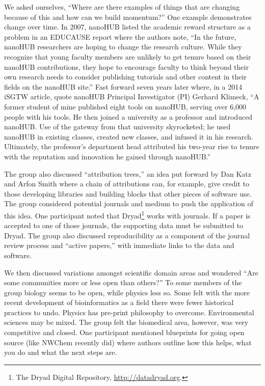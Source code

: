 \documentclass[11pt, oneside]{amsart}
\begin{document}
We asked ourselves, ``Where are there examples of things that are changing
because of this and how can we build momentum?'' One example demonstrates change
over time. In 2007, nanoHUB listed the academic reward structure as a problem in
an EDUCAUSE report where the authors note, ``In the future, nanoHUB researchers
are hoping to change the research culture. While they recognize that young
faculty members are unlikely to get tenure based on their nanoHUB contributions,
they hope to encourage faculty to think beyond their own research needs to
consider publishing tutorials and other content in their fields on the
nanoHUB site.'' Fast forward seven years later where, in a 2014 iSGTW article,
quote nanoHUB Principal Investigator (PI) Gerhard Klimeck, ``A former student of
mine published eight tools on nanoHUB, serving over 6,000 people with his tools.
He then joined a university as a professor and introduced nanoHUB. Use of the
gateway from that university skyrocketed; he used nanoHUB in existing classes,
created new classes, and infused it in his research. Ultimately, the professor's
department head attributed his two-year rise to tenure with the reputation and
innovation he gained through nanoHUB.''

The group also discussed ``attribution trees,'' an idea put forward by Dan Katz
and Arfon Smith where a chain of attributions can, for example, give credit to
those developing libraries and building blocks that other pieces of software
use. The group considered potential journals and medium to push the application
of this idea. One participant noted that Dryad\footnote{The Dryad Digital
Repository, \url{http://datadryad.org}.} works with journals. If a paper is
accepted to one of those journals, the supporting data must be submitted to Dryad.
The group also discussed reproducibility as
a component of the journal review process and ``active papers,'' with immediate
links to the data and software.

We then discussed variations amongst scientific domain areas and wondered ``Are
some communities more or less open than others?'' To some members of the group
biology seems to be open, while physics less so. Some felt with the more recent
development of bioinformatics as a field there were fewer historical practices
to undo. Physics has pre-print philosophy to overcome. Environmental sciences
may be mixed. The group felt the biomedical area, however, was very competitive
and closed. One participant mentioned blueprints for going open source (like
NWChem recently did) where authors outline how this helps, what you do and what
the next steps are.
\end{document}
